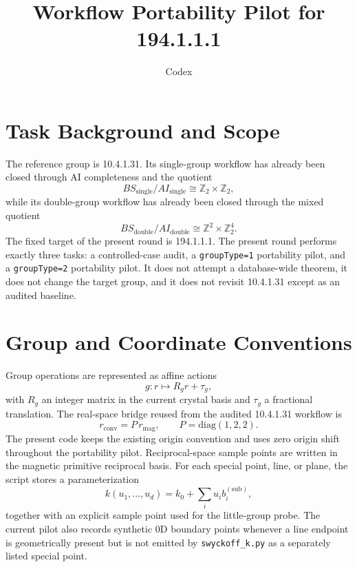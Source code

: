 \documentclass[11pt]{article}
\title{Workflow Portability Pilot for 194.1.1.1}
\author{Codex}
\date{}
\begin{document}
\maketitle

\section{Task Background and Scope}
The reference group is 10.4.1.31. Its single-group workflow has already been closed through AI completeness and the quotient
\[
BS_{\mathrm{single}}/AI_{\mathrm{single}} \cong \mathbb{Z}_2 \times \mathbb{Z}_2,
\]
while its double-group workflow has already been closed through the mixed quotient
\[
BS_{\mathrm{double}}/AI_{\mathrm{double}} \cong \mathbb{Z}^2 \times \mathbb{Z}_2^4.
\]
The fixed target of the present round is 194.1.1.1. The present round performs exactly three tasks: a controlled-case audit, a \texttt{groupType=1} portability pilot, and a \texttt{groupType=2} portability pilot. It does not attempt a database-wide theorem, it does not change the target group, and it does not revisit 10.4.1.31 except as an audited baseline.

\section{Group and Coordinate Conventions}
Group operations are represented as affine actions
\[
g : r \mapsto R_g r + \tau_g,
\]
with $R_g$ an integer matrix in the current crystal basis and $\tau_g$ a fractional translation. The real-space bridge reused from the audited 10.4.1.31 workflow is
\[
r_{\mathrm{conv}} = P\, r_{\mathrm{mag}}, \qquad
P = \mathrm{diag}(1,2,2).
\]
The present code keeps the existing origin convention and uses zero origin shift throughout the portability pilot. Reciprocal-space sample points are written in the magnetic primitive reciprocal basis. For each special point, line, or plane, the script stores a parameterization
\[
k(u_1,\dots,u_d) = k_0 + \sum_i u_i b_i^{(\mathrm{sub})},
\]
together with an explicit sample point used for the little-group probe. The current pilot also records synthetic 0D boundary points whenever a line endpoint is geometrically present but is not emitted by \texttt{swyckoff\_k.py} as a separately listed special point.
\end{document}
